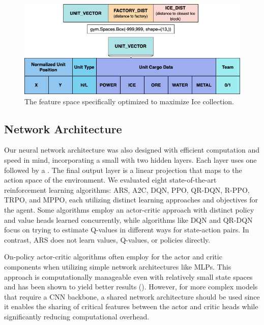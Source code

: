 \begin{figure}[htbp]
    \centering
    \includegraphics[width=0.8\linewidth]{images/methods_singleunit/observation/feature_space.png}
    \captionsetup{justification=justified, singlelinecheck=false, width=1\linewidth, labelfont=bf} 
    \caption[]{The feature space specifically optimized to maximize Ice collection.}
    \label{fig:feature-space}
\end{figure}

\subsection{Network Architecture}
\label{subsec:single-network}

\noindent Our neural network architecture was also designed with efficient computation and speed in mind, incorporating a small  with two hidden layers. Each layer uses one  followed by a . The final output layer is a linear projection that maps to the action space of the environment. We evaluated eight state-of-the-art reinforcement learning algorithms: ARS, A2C, DQN, PPO, QR-DQN, R-PPO, TRPO, and MPPO, each utilizing distinct learning approaches and objectives for the agent. Some algorithms employ an actor-critic approach with distinct policy and value heads learned concurrently, while algorithms like DQN and QR-DQN focus on trying to estimate Q-values in different ways for state-action pairs. In contrast, ARS does not learn values, Q-values, or policies directly.

\bigskip

\noindent On-policy actor-critic algorithms often employ  for the actor and critic components when utilizing simple network architectures like MLPs. This approach is computationally manageable even with relatively small state spaces and has been shown to yield better results (\textcolor{deepblue}{\cite{andrychowicz2020matters}}). However, for more complex models that require a CNN backbone, a shared network architecture should be used since it enables the sharing of critical features between the actor and critic heads while significantly reducing computational overhead. 

